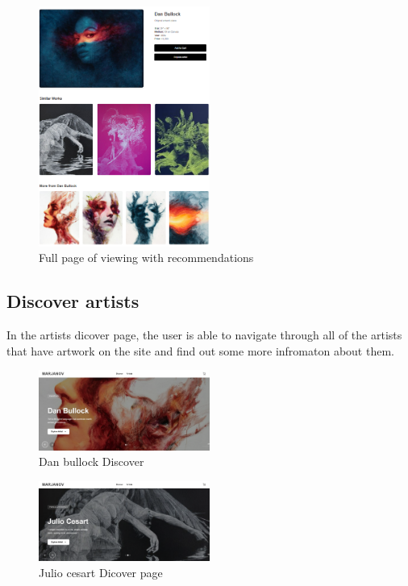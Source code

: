 \documentclass[]{project_final}
\begin{document}
\begin{figure}[ht!]
  \centering
  \includegraphics[width=0.5\textwidth]{AG7.png}
  \vspace*{0.0cm}
  \caption{Full page of viewing with recommendations}
  \label{fig:1}
\end{figure}

\subsection{Discover artists}
In the artists dicover page, the user is able to navigate through all of the artists that have artwork on the site and find out some more infromaton about them.

\begin{figure}[ht!]
  \centering
  \includegraphics[width=0.5\textwidth]{AG8.png}
  \vspace*{0.0cm}
  \caption{Dan bullock Discover}
  \label{fig:1}
\end{figure}

\begin{figure}[ht!]
  \centering
  \includegraphics[width=0.5\textwidth]{AG9.png}
  \vspace*{0.0cm}
  \caption{Julio cesart Dicover page}
  \label{fig:1}
\end{figure}
\end{document}
